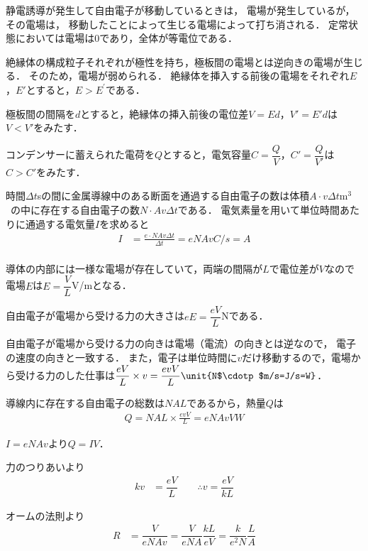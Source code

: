 \begin{comment}

\end{comment}
静電誘導が発生して自由電子が移動しているときは，
電場が発生しているが，その電場は，
移動したことによって生じる電場によって打ち消される．
定常状態においては電場は0であり，全体が等電位である．

絶縁体の構成粒子それぞれが極性を持ち，極板間の電場とは逆向きの電場が生じる．
そのため，電場が弱められる．
絶縁体を挿入する前後の電場をそれぞれ$E$，$E'$とすると，$E>E^\prime$である．

極板間の間隔を$d$とすると，絶縁体の挿入前後の電位差$V=Ed$，$V'=E'd$は$V<V'$をみたす．

コンデンサーに蓄えられた電荷を$Q$とすると，電気容量$C=\dfrac{Q}{V}$，$C'=\dfrac{Q}{V'}$は$C>C'$をみたす．

時間$\varDelta t$\unit{s}の間に金属導線中のある断面を通過する自由電子の数は体積$A\cdotp v\varDelta t$\unit{$\text{m}^3$}の中に存在する自由電子の数$N\cdotp Av\varDelta t$である．
電気素量を用いて単位時間あたりに通過する電気量$I$を求めると
\begin{align*}
I&=\frac{e\cdotp NAv\varDelta t}{\varDelta t} = eNAv\unit{C/s=A}\\
\end{align*}

導体の内部には一様な電場が存在していて，両端の間隔が$L$で電位差が$V$なので電場$E$は$E=\dfrac{V}{L}$\unit{V/m}となる．

自由電子が電場から受ける力の大きさは$eE=\dfrac{eV}{L}$\unit{N}である．

自由電子が電場から受ける力の向きは電場（電流）の向きとは逆なので，
電子の速度の向きと一致する．
また，電子は単位時間に$v$だけ移動するので，電場から受ける力のした仕事は$\dfrac{eV}{L}\times v = \dfrac{evV}{L}\unit{N$\cdotp$m/s=J/s=W}$．

導線内に存在する自由電子の総数は$NAL$であるから，熱量$Q$は
\begin{align*}
  Q=NAL\times \frac{evV}{L} = eNAvV\unit{W}
\end{align*}

$I=eNAv$より$Q=IV$．

力のつりあいより
\begin{align*}
  kv &=\dfrac{eV}{L} \qquad \therefore
  v =\dfrac{eV}{kL}
\end{align*}

オームの法則より
\begin{align*}
  R &= \dfrac{V}{eNAv} = \dfrac{V}{eNA}\dfrac{kL}{eV} = \dfrac{k}{e^2N}\dfrac{L}{A}
\end{align*}


